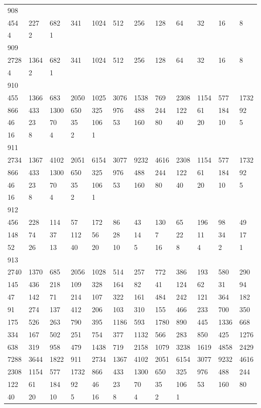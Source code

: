 \begin{longtable}{llllllllllll}
908&&&&&&&&&&&\\
454& 227& 682& 341& 1024& 512& 256& 128& 64& 32& 16& 8\\
4& 2& 1& \\

909&&&&&&&&&&&\\
2728& 1364& 682& 341& 1024& 512& 256& 128& 64& 32& 16& 8\\
4& 2& 1& \\

910&&&&&&&&&&&\\
455& 1366& 683& 2050& 1025& 3076& 1538& 769& 2308& 1154& 577& 1732\\
866& 433& 1300& 650& 325& 976& 488& 244& 122& 61& 184& 92\\
46& 23& 70& 35& 106& 53& 160& 80& 40& 20& 10& 5\\
16& 8& 4& 2& 1& \\

911&&&&&&&&&&&\\
2734& 1367& 4102& 2051& 6154& 3077& 9232& 4616& 2308& 1154& 577& 1732\\
866& 433& 1300& 650& 325& 976& 488& 244& 122& 61& 184& 92\\
46& 23& 70& 35& 106& 53& 160& 80& 40& 20& 10& 5\\
16& 8& 4& 2& 1& \\

912&&&&&&&&&&&\\
456& 228& 114& 57& 172& 86& 43& 130& 65& 196& 98& 49\\
148& 74& 37& 112& 56& 28& 14& 7& 22& 11& 34& 17\\
52& 26& 13& 40& 20& 10& 5& 16& 8& 4& 2& 1\\

913&&&&&&&&&&&\\
2740& 1370& 685& 2056& 1028& 514& 257& 772& 386& 193& 580& 290\\
145& 436& 218& 109& 328& 164& 82& 41& 124& 62& 31& 94\\
47& 142& 71& 214& 107& 322& 161& 484& 242& 121& 364& 182\\
91& 274& 137& 412& 206& 103& 310& 155& 466& 233& 700& 350\\
175& 526& 263& 790& 395& 1186& 593& 1780& 890& 445& 1336& 668\\
334& 167& 502& 251& 754& 377& 1132& 566& 283& 850& 425& 1276\\
638& 319& 958& 479& 1438& 719& 2158& 1079& 3238& 1619& 4858& 2429\\
7288& 3644& 1822& 911& 2734& 1367& 4102& 2051& 6154& 3077& 9232& 4616\\
2308& 1154& 577& 1732& 866& 433& 1300& 650& 325& 976& 488& 244\\
122& 61& 184& 92& 46& 23& 70& 35& 106& 53& 160& 80\\
40& 20& 10& 5& 16& 8& 4& 2& 1& \\


\end{longtable}
